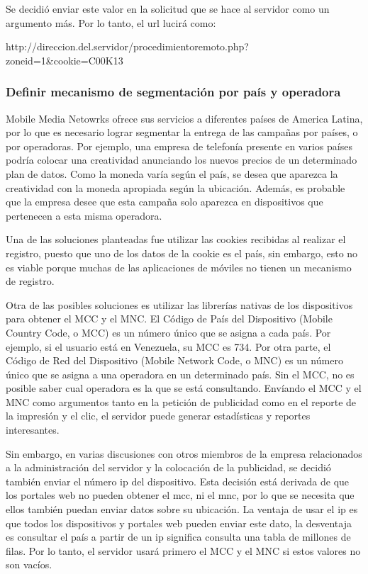 Se decidió enviar este valor en la solicitud que se hace al servidor
como un argumento más. Por lo tanto, el url lucirá como:

\begin{center}
http://direccion.del.servidor/procedimientoremoto.php?zoneid=1\&cookie=C00K13
\par\end{center}


\subsubsection{Definir mecanismo de segmentación por país y operadora\label{mcc-mnc}}

Mobile Media Netowrks ofrece sus servicios a diferentes países de
America Latina, por lo que es necesario lograr segmentar la entrega
de las campañas por países, o por operadoras. Por ejemplo, una empresa
de telefonía presente en varios países podría colocar una creatividad
anunciando los nuevos precios de un determinado plan de datos. Como
la moneda varía según el país, se desea que aparezca la creatividad
con la moneda apropiada según la ubicación. Además, es probable que
la empresa desee que esta campaña solo aparezca en dispositivos que
pertenecen a esta misma operadora. 

Una de las soluciones planteadas fue utilizar las cookies recibidas
al realizar el registro, puesto que uno de los datos de la cookie
es el país, sin embargo, esto no es viable porque muchas de las aplicaciones
de móviles no tienen un mecanismo de registro.

Otra de las posibles soluciones es utilizar las librerías nativas
de los dispositivos para obtener el MCC y el MNC. El Código de País
del Dispositivo (Mobile Country Code, o MCC) es un número único que
se asigna a cada país. Por ejemplo, si el usuario está en Venezuela,
su MCC es 734. Por otra parte, el Código de Red del Dispositivo (Mobile
Network Code, o MNC) es un número único que se asigna a una operadora
en un determinado país. Sin el MCC, no es posible saber cual operadora
es la que se está consultando. Envíando el MCC y el MNC como argumentos
tanto en la petición de publicidad como en el reporte de la impresión
y el clic, el servidor puede generar estadísticas y reportes interesantes. 

Sin embargo, en varias discusiones con otros miembros de la empresa
relacionados a la administración del servidor y la colocación de la
publicidad, se decidió también enviar el número ip del dispositivo.
Esta decisión está derivada de que los portales web no pueden obtener
el mcc, ni el mnc, por lo que se necesita que ellos también puedan
enviar datos sobre su ubicación. La ventaja de usar el ip es que todos
los dispositivos y portales web pueden enviar este dato, la desventaja
es consultar el país a partir de un ip significa consulta una tabla
de millones de filas. Por lo tanto, el servidor usará primero el MCC
y el MNC si estos valores no son vacíos. 

